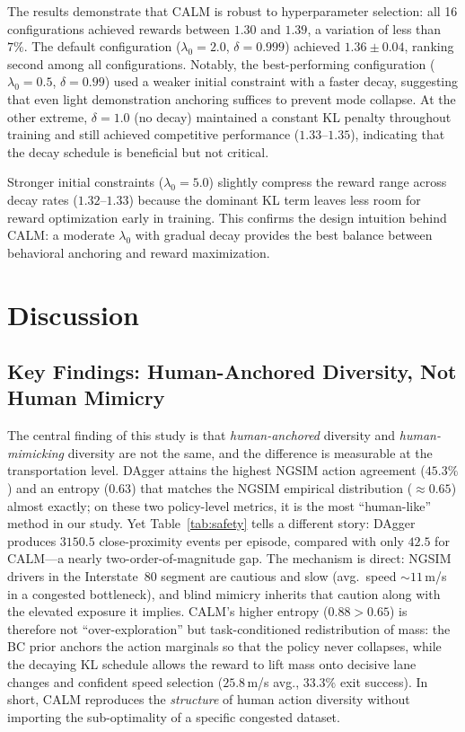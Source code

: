 \documentclass[journal]{IEEEtran}
\begin{document}
The results demonstrate that CALM is robust to hyperparameter selection: all 16 configurations achieved rewards between $1.30$ and $1.39$, a variation of less than $7\%$. The default configuration ($\lambda_0 = 2.0$, $\delta = 0.999$) achieved $1.36 \pm 0.04$, ranking second among all configurations. Notably, the best-performing configuration ($\lambda_0 = 0.5$, $\delta = 0.99$) used a weaker initial constraint with a faster decay, suggesting that even light demonstration anchoring suffices to prevent mode collapse. At the other extreme, $\delta = 1.0$ (no decay) maintained a constant KL penalty throughout training and still achieved competitive performance ($1.33$--$1.35$), indicating that the decay schedule is beneficial but not critical.

Stronger initial constraints ($\lambda_0 = 5.0$) slightly compress the reward range across decay rates ($1.32$--$1.33$) because the dominant KL term leaves less room for reward optimization early in training. This confirms the design intuition behind CALM: a moderate $\lambda_0$ with gradual decay provides the best balance between behavioral anchoring and reward maximization.

\section{Discussion}
\label{sec:discussion}

\subsection{Key Findings: Human-Anchored Diversity, Not Human Mimicry}

The central finding of this study is that \emph{human-anchored} diversity and \emph{human-mimicking} diversity are not the same, and the difference is measurable at the transportation level. DAgger attains the highest NGSIM action agreement ($45.3\%$) and an entropy ($0.63$) that matches the NGSIM empirical distribution ($\approx 0.65$) almost exactly; on these two policy-level metrics, it is the most ``human-like'' method in our study. Yet Table~\ref{tab:safety} tells a different story: DAgger produces $3150.5$ close-proximity events per episode, compared with only $42.5$ for CALM---a nearly two-order-of-magnitude gap. The mechanism is direct: NGSIM drivers in the Interstate~80 segment are cautious and slow (avg.\ speed $\sim\!11$\,m/s in a congested bottleneck), and blind mimicry inherits that caution along with the elevated exposure it implies. CALM's higher entropy ($0.88 > 0.65$) is therefore not ``over-exploration'' but task-conditioned redistribution of mass: the BC prior anchors the action marginals so that the policy never collapses, while the decaying KL schedule allows the reward to lift mass onto decisive lane changes and confident speed selection ($25.8$\,m/s avg., $33.3\%$ exit success). In short, CALM reproduces the \emph{structure} of human action diversity without importing the sub-optimality of a specific congested dataset.
\end{document}
